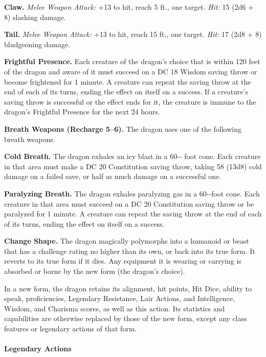 \documentclass[
]{article}
\begin{document}
\textbf{Claw.} \emph{Melee Weapon Attack:} +13 to hit, reach 5 ft., one
target. \emph{Hit:} 15 (2d6 + 8) slashing damage.

\textbf{Tail.} \emph{Melee Weapon Attack:} +13 to hit, reach 15 ft., one
target. \emph{Hit:} 17 (2d8 + 8) bludgeoning damage.

\textbf{Frightful Presence.} Each creature of the dragon's choice that
is within 120 feet of the dragon and aware of it must succeed on a DC 18
Wisdom saving throw or become frightened for 1 minute. A creature can
repeat the saving throw at the end of each of its turns, ending the
effect on itself on a success. If a creature's saving throw is
successful or the effect ends for it, the creature is immune to the
dragon's Frightful Presence for the next 24 hours.

\textbf{Breath Weapons (Recharge 5--6).} The dragon uses one of the
following breath weapons.

\textbf{Cold Breath.} The dragon exhales an icy blast in a 60-­‐ foot
cone. Each creature in that area must make a DC 20 Constitution saving
throw, taking 58 (13d8) cold damage on a failed save, or half as much
damage on a successful one.

\textbf{Paralyzing Breath.} The dragon exhales paralyzing gas in a
60-­‐foot cone. Each creature in that area must succeed on a DC 20
Constitution saving throw or be paralyzed for 1 minute. A creature can
repeat the saving throw at the end of each of its turns, ending the
effect on itself on a success.

\textbf{Change Shape.} The dragon magically polymorphs into a humanoid
or beast that has a challenge rating no higher than its own, or back
into its true form. It reverts to its true form if it dies. Any
equipment it is wearing or carrying is absorbed or borne by the new form
(the dragon's choice).

In a new form, the dragon retains its alignment, hit points, Hit Dice,
ability to speak, proficiencies, Legendary Resistance, Lair Actions, and
Intelligence, Wisdom, and Charisma scores, as well as this action. Its
statistics and capabilities are otherwise replaced by those of the new
form, except any class features or legendary actions of that form.

\hypertarget{legendary-actions-19}{%
\paragraph{Legendary Actions}\label{legendary-actions-19}}
\end{document}
